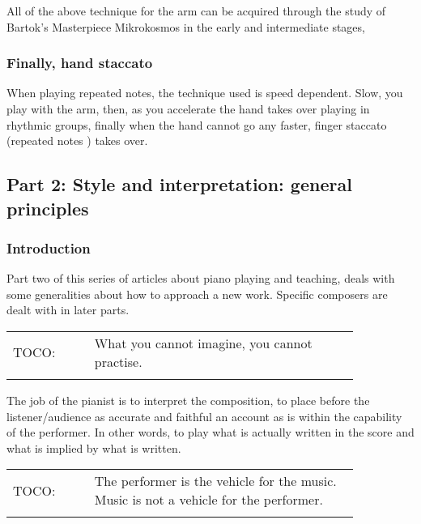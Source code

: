 \documentclass{article}
\begin{document}

All of the above technique for the arm can be acquired through the study of Bartok’s Masterpiece Mikrokosmos in the early and intermediate stages,

\subsubsection{Finally, hand staccato}

When playing repeated notes, the technique used is speed dependent.
Slow, you play with the arm, then, as you accelerate the hand takes over playing in rhythmic groups, finally when the hand cannot go any faster, finger staccato (repeated notes ) takes over.

\subsection{Part 2: Style and interpretation: general principles}

\subsubsection{Introduction}

Part two of this series of articles about piano playing and teaching, deals with some generalities about how to approach a new work.
Specific composers are dealt with in later parts.

\begin{tabular}{p{0.2\linewidth}p{0.65\linewidth}}
    \\
    TOCO: & What you cannot imagine, you cannot practise.\\
    \\
\end{tabular}

The job of the pianist is to interpret the composition, to place before the listener/audience as accurate and faithful an account as is within the capability of the performer.
In other words, to play what is actually written in the score and what is implied by what is written.

\begin{tabular}{p{0.2\linewidth}p{0.65\linewidth}}
    \\
    TOCO: & The performer is the vehicle for the music.
    Music is not a vehicle for the performer.\\
    \\
\end{tabular}
\end{document}
